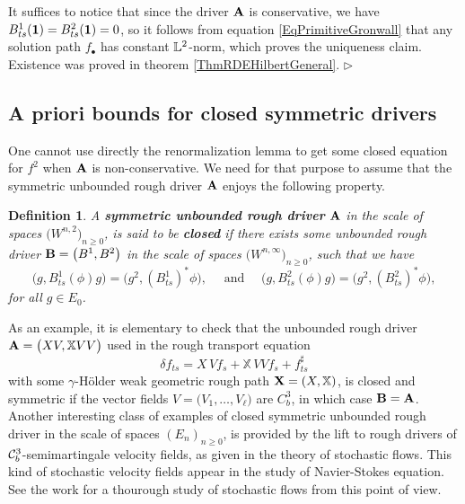 \documentclass[11pt,a4paper]{amsart}
\newcommand{\bbX}{\mathbb{X}}
\renewcommand{\geq}{\geqslant}
\newcommand{\ssk}{\smallskip}
\newtheorem{defn}[thm]{ \hspace{-0.3cm} {\sc Definition}}%
\numberwithin{equation}{section} %
\newenvironment{Dem}{%
    \begin{list}{\hspace{0.5cm}{\sc Proof --}}{%
        \setlength{\topsep}{0pt}%
        \setlength{\leftmargin}{0pt}%
        \setlength{\rightmargin}{0pt}%
        \setlength{\listparindent}{0pt}%
        \setlength{\itemindent}{0pt}%
        \setlength{\parsep}{0pt}%
        \addtolength{\leftmargin}{20pt}%
        \addtolength{\rightmargin}{0pt}%
    } \item }{\hfill{\space $\rhd$}\end{list}\smallskip}
\begin{document}
\ssk

\begin{Dem}
It suffices to notice that since the driver $\bf A$ is conservative, we have $B^1_{ts}({\bf 1}) = B^2_{ts}({\bf 1}) = 0$, so it follows from equation \eqref{EqPrimitiveGronwall} that any solution path $f_\bullet$ has constant $\mathbb{L}^2$-norm, which proves the uniqueness claim. Existence was proved in theorem \ref{ThmRDEHilbertGeneral}.
\end{Dem}


\bigskip


\subsection{A priori bounds for closed symmetric drivers}
\label{SymmetricDrivers}

One cannot use directly the renormalization lemma to get some closed equation for $f^2$ when $\bf A$ is non-conservative. We need for that purpose to assume that the symmetric unbounded rough driver $\bf A$ enjoys the following property.

\begin{defn}
A \emph{\textbf{symmetric unbounded rough driver}} $\bf A$ in the scale of spaces $\big(W^{n,2}\big)_{n\geq 0}$, is said to be \emph{\textbf{closed}} if there exists some unbounded rough driver ${\bf B}=\big(B^1,B^2\big)$ in the scale of spaces $\big(W^{n,\infty}\big)_{n\geq 0}$, such that we have  
$$
\Big(g,B^1_{ts}(\phi)g\Big) = \Big(g^2,(B^1_{ts})^*\phi\Big), \quad \textrm{  and  } \quad \Big(g,B^2_{ts}(\phi)g\Big) = \Big(g^2,(B^2_{ts})^*\phi\Big),
$$
for all $g\in E_0$. 
\end{defn}

As an example, it is elementary to check that the unbounded rough driver ${\bfA} = \big(XV,\bbX VV\big)$ used in the rough transport equation
\begin{equation*}
\delta f_{ts} = X\,Vf_s +  \bbX\,V V f_s + f^\sharp_{ts}
\end{equation*}
with some $\gamma$-H\"older weak geometric rough path ${\bfX} = (X,\bbX)$, is closed and symmetric if the vector fields $V = \big(V_1,\dots,V_\ell\big)$ are $C^3_b$, in which case $\bf B = \bf A$. Another interesting class of examples of closed symmetric unbounded rough driver in the scale of spaces $(E_n)_{n\geq 0}$, is provided by the lift to rough drivers of $\mathcal{C}^3_b$-semimartingale velocity fields, as given in the theory of stochastic flows. This kind of stochastic velocity fields appear in the study of Navier-Stokes equation. See the work \cite{BailleulRiedel} for a thourough study of stochastic flows from this point of view. 
\end{document}
